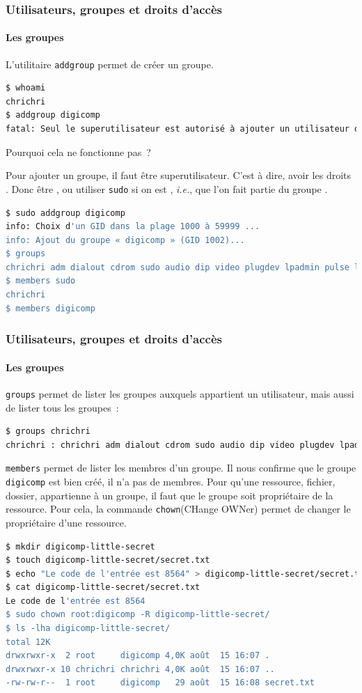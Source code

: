 \documentclass{beamer}
\begin{document}
    \begin{frame}[fragile]
        \transdissolve
        \frametitle{Utilisateurs, groupes et droits d'accès}
        \framesubtitle{Les groupes}
        L'utilitaire \lstinline{addgroup} permet de créer un groupe.
        \begin{lstlisting}[language=bash]
$ whoami
chrichri
$ addgroup digicomp
fatal: Seul le superutilisateur est autorisé à ajouter un utilisateur ou un groupe au système.
        \end{lstlisting}
        Pourquoi cela ne fonctionne pas~?
        \pause
        \begin{dangercolorbox}
            Pour ajouter un groupe, il faut être superutilisateur.
            C'est à dire, avoir les droits .
            Donc être , ou utiliser \lstinline{sudo} si on est , \textit{i.e.}, que l'on fait partie du groupe .
        \end{dangercolorbox}
        \begin{lstlisting}[language=bash]
$ sudo addgroup digicomp
info: Choix d'un GID dans la plage 1000 à 59999 ...
info: Ajout du groupe « digicomp » (GID 1002)...
$ groups
chrichri adm dialout cdrom sudo audio dip video plugdev lpadmin pulse lxd sambashare docker libvirt nordvpn
$ members sudo
chrichri
$ members digicomp
        \end{lstlisting}
    \end{frame}

    \begin{frame}[fragile]
        \transdissolve
        \frametitle{Utilisateurs, groupes et droits d'accès}
        \framesubtitle{Les groupes}
        \lstinline{groups} permet de lister les groupes auxquels appartient un utilisateur, mais aussi de lister tous les groupes~:
        \begin{lstlisting}[language=bash]
$ groups chrichri
chrichri : chrichri adm dialout cdrom sudo audio dip video plugdev lpadmin pulse lxd sambashare nordvpn docker libvirt
        \end{lstlisting}
        \lstinline{members} permet de lister les membres d'un groupe.
        Il nous confirme que le groupe \lstinline{digicomp} est bien créé, il n'a pas de membres.
        \bigbreak
        Pour qu'une ressource, fichier, dossier, appartienne à un groupe, il faut que le groupe soit propriétaire de la ressource.
        Pour cela, la commande \lstinline{chown}(CHange OWNer) permet de changer le propriétaire d'une ressource.
        \begin{lstlisting}[language=bash]
$ mkdir digicomp-little-secret
$ touch digicomp-little-secret/secret.txt
$ echo "Le code de l'entrée est 8564" > digicomp-little-secret/secret.txt
$ cat digicomp-little-secret/secret.txt
Le code de l'entrée est 8564
$ sudo chown root:digicomp -R digicomp-little-secret/
$ ls -lha digicomp-little-secret/
total 12K
drwxrwxr-x  2 root     digicomp 4,0K août  15 16:07 .
drwxrwxr-x 10 chrichri chrichri 4,0K août  15 16:07 ..
-rw-rw-r--  1 root     digicomp   29 août  15 16:08 secret.txt
        \end{lstlisting}
    \end{frame}
\end{document}
